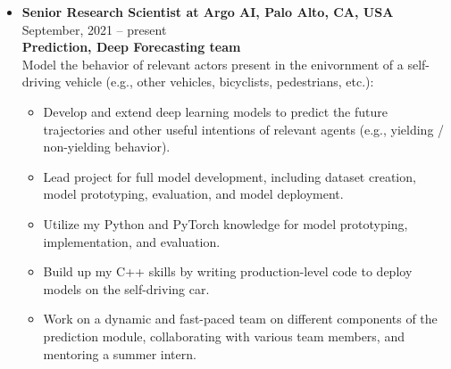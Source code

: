 \documentclass[10pt,letterpaper]{article}
\newcommand{\thing}[2]{{#1} \hfill {#2}}
\begin{document}
\begin{itemize}%

\item \thing{\bf Senior Research Scientist at Argo AI, Palo Alto, CA, USA}{September, 2021 -- present}\\
	{\bf Prediction, Deep Forecasting team}\vspace{0.5em}\\
      	Model the behavior of relevant actors present in the enivornment of a self-driving vehicle (e.g., other vehicles, bicyclists, pedestrians, etc.):
      	\begin{itemize} \itemsep0em 
      	\vspace{-0.5em}
      		\item Develop and extend deep learning models to predict the future trajectories and other useful intentions of relevant agents (e.g., yielding / non-yielding behavior).
      		\item Lead project for full model development, including dataset creation, model prototyping, evaluation, and model deployment.
      		\item Utilize my Python and PyTorch knowledge for model prototyping, implementation, and evaluation.
      		\item Build up my C++ skills by writing production-level code to deploy models on the self-driving car.
      		\item Work on a dynamic and fast-paced team on different components of the prediction module, collaborating with various team members, and mentoring a summer intern.
	\end{itemize}
	

\end{itemize}
\end{document}
